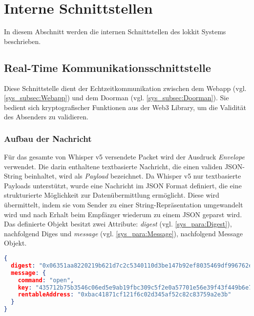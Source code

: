 \section{Interne Schnittstellen}
In diesem Abschnitt werden die internen Schnittstellen des lokkit Systems beschrieben.

\subsection{Real-Time Kommunikationsschnittstelle}
\label{sys_subsec:Real_Time_Kommunikationsschnittstelle}
Diese Schnittstelle dient der Echtzeitkommunikation zwischen dem Webapp (vgl. \ref{sys_subsec:Webapp}) und dem Doorman (vgl. \ref{sys_subsec:Doorman}). Sie bedient sich kryptografischer Funktionen aus der Web3 Library, um die Validität des Absenders zu validieren.

\subsubsection{Aufbau der Nachricht}
Für das gesamte von Whisper v5 versendete Packet wird der Ausdruck \emph{Envelope} verwendet. Die darin enthaltene textbasierte Nachricht, die einen validen JSON-String beinhaltet, wird als \emph{Payload} bezeichnet. Da Whisper v5 nur textbasierte Payloads unterstützt, wurde eine Nachricht im \acrshort{JSON} Format definiert, die eine strukturierte Möglichkeit zur Datenübermittlung ermöglicht. Diese wird übermittelt, indem sie vom Sender zu einer String-Repräsentation umgewandelt wird und nach Erhalt beim Empfänger wiederum zu einem JSON geparst wird. Das definierte Objekt besitzt zwei Attribute: \emph{digest} (vgl. \ref{sys_para:Digest}), nachfolgend Diges und \emph{message} (vgl. \ref{sys_para:Message}), nachfolgend Message Objekt. 

\begin{lstlisting}[language=json,caption={Beispiel einer lokkit JSON Nachricht, deren \emph{digest} vom account \emph{0x55047206d03afef0d79bb2d90710bf9f23737860} erstellt wurde.}]
{
  digest: "0x06351aa8220219b621d7c2c5340110d3be147b92ef8035469df996762e021f512f4f8  30dee0ed1d59998b4bafaa3abb589668d940bdce867f7e6d83315a454af1b",
  message: {
    command: "open",
    key: "435712b75b3546c06ed5e9ab19fbc309c5f2e0a57701e56e39f43f449b6e72c9",
    rentableAddress: "0xbac41871cf121f6c02d345af52c82c83759a2e3b"
  }
}
\end{lstlisting}

